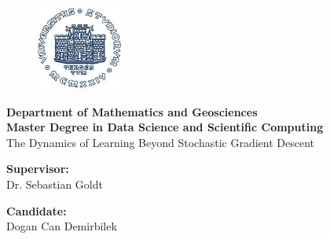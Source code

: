 \begin{titlepage} 
\begin{figure}[t] 
    \centering\includegraphics[width=0.25\textwidth]{figures/logo.jpeg}
\end{figure}
\vspace{20mm}

\begin{Large}
 \begin{center}
	\textbf{Department of Mathematics and Geosciences\\ Master Degree in Data Science and Scientific Computing \\}
	\vspace{20mm}
    {\Large{The Dynamics of Learning Beyond Stochastic Gradient Descent  }}\\
	\vspace{10mm}
	{\huge{\bf }}
\end{center}
\end{Large}


\vspace{36mm}
\begin{minipage}[t]{0.47\textwidth}\raggedright
	{\large{\textbf{Supervisor:}\\ Dr. Sebastian Goldt}}
\end{minipage}
\hfill
\begin{minipage}[t]{0.47\textwidth}\raggedleft
	{\large{ \textbf{Candidate:} \\ Dogan Can Demirbilek}}
\end{minipage}

\vspace{25mm}

\hrulefill

\vspace{5mm}


\end{titlepage}